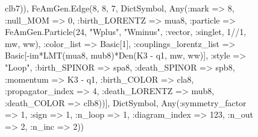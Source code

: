 \documentclass{revtex4}
\begin{document}
\begin{figure}[!htb]
\begin{center}
{clb7)), FeAmGen.Edge(8, 8, 7, Dict{Symbol, Any}(:mark => 8, :null_MOM => 0, :birth_LORENTZ => mua8, :particle => FeAmGen.Particle(24, "Wplus", "Wminus", :vector, :singlet, 1//1, mw, ww), :color_list => Basic[1], :couplings_lorentz_list => Basic[-im*LMT(mua8, mub8)*Den(K3 - q1, mw, ww)], :style => "Loop", :birth_SPINOR => spa8, :death_SPINOR => spb8, :momentum => K3 - q1, :birth_COLOR => cla8, :propagator_index => 4, :death_LORENTZ => mub8, :death_COLOR => clb8))], Dict{Symbol, Any}(:symmetry_factor => 1, :sign => 1, :n_loop => 1, :diagram_index => 123, :n_out => 2, :n_inc => 2)) 
}
\end{center}
\end{figure}
\end{document}
